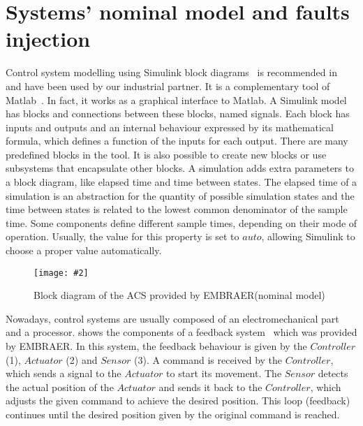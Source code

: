 \documentclass[en,twoside,onehalfspacing,phd]{risethesis}
\newcommand{\includegraphicsaspectratio}[2][1]{%
  \texttt{[image: \#2]}%
}
\newcommand{\EMBRAER}{EMBRAER\xspace}
\newcommand{\matlab}{\textsf{Matlab}\xspace}
\newcommand{\textsim}[1]{$#1$}
\newcommand{\simulink}{Simulink\xspace}
\newcommand{\parsin}[1]{\ensuremath\left( #1 \right)}
\begin{document}

\section{Systems' nominal model and faults injection}
\label{sec:faults-injection}

Control system modelling using \simulink block diagrams~\cite{MathWorks2010} is recommended in~\cite{Nise1992} and have been used by our industrial partner.
It is a complementary tool of \matlab~\cite{MathWorks2010c}.
In fact, it works as a graphical interface to \matlab.
A \simulink model has blocks and connections between these blocks, named signals.
Each block has inputs and outputs and an internal behaviour expressed by its mathematical formula, which defines a function of the inputs for each output.
There are many predefined blocks in the tool.
It is also possible to create new blocks or use subsystems that encapsulate other blocks.
A simulation adds extra parameters to a block diagram, like elapsed time and time between states.
The elapsed time of a simulation is an abstraction for the quantity of possible simulation states and the time between states is related to the lowest common denominator of the sample time.
Some components define different sample times, depending on their mode of operation.
Usually, the value for this property is set to \textsim{auto}, allowing \simulink to choose a proper value automatically.

\begin{figure}[t] \centering
  \includegraphicsaspectratio{acsBlockDiagrams}
  \caption{Block diagram of the ACS provided by \EMBRAER (nominal model)}
  \label{fg:acsBlockDiagrams}
\end{figure}

Nowadays, control systems are usually composed of an electromechanical part and a processor.
 shows the components of a feedback system~\cite{AM2008} which was provided by \EMBRAER.
In this system, the feedback behaviour is given by the \textsim{Controller} (1), \textsim{Actuator} (2) and \textsim{Sensor} (3). A command is received by the \textsim{Controller}, which sends a signal to the \textsim{Actuator} to start its movement.
The \textsim{Sensor} detects the actual position of the \textsim{Actuator} and sends it back to the \textsim{Controller}, which adjusts the given command to achieve the desired position. This loop (feedback) continues until the desired position given by the original command is reached.
\end{document}
